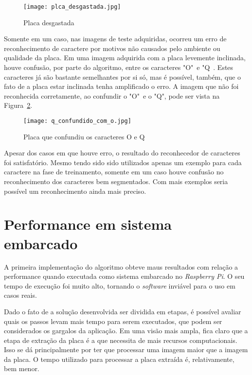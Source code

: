 \begin{figure}[H]
	\centering
	\texttt{[image: plca\_desgastada.jpg]}
	\caption{Placa desgastada}
	\label{fig:placa_desgastada}
\end{figure}

Somente em um caso, nas imagens de teste adquiridas, ocorreu um erro de reconhecimento de caractere por motivos não causados pelo ambiente ou qualidade da placa. Em uma imagem adquirida com a placa levemente inclinada, houve confusão, por parte do algoritmo, entre os caracteres "O"~e "Q~. Estes caracteres já são bastante semelhantes por si só, mas é possível, também, que o fato de a placa estar inclinada tenha amplificado o erro. A imagem que não foi reconhecida corretamente, ao confundir o "O"~e o "Q", pode ser vista na Figura~\ref{fig:q_confundido_com_o}.

\begin{figure}[H]
	\centering
	\texttt{[image: q\_confundido\_com\_o.jpg]}
	\caption{Placa que confundiu os caracteres O e Q}
	\label{fig:q_confundido_com_o}
\end{figure}

Apesar dos casos em que houve erro, o resultado do reconhecedor de caracteres foi satisfatório. Mesmo tendo sido sido utilizados apenas um exemplo para cada caractere na fase de treinamento, somente em um caso houve confusão no reconhecimento dos caracteres bem segmentados. Com mais exemplos seria possível um reconhecimento ainda mais preciso.

\section{Performance em sistema embarcado}
\label{sec:performance_resultados}

A primeira implementação do algoritmo obteve maus resultados com relação a
performance quando executada como sistema embarcado no \emph{Raspberry Pi}. 
O seu tempo de execução foi muito alto, tornando o \emph{software} inviável para 
o uso em casos reais.

Dado o fato de a solução desenvolvida ser dividida em etapas, é possível avaliar
quais os passos levam mais tempo para serem executados, que podem ser
considerados os gargalos da aplicação. Em uma visão mais ampla, fica claro que a
etapa de extração da placa é a que necessita de mais recursos computacionais.
Isso se dá principalmente por ter que processar uma imagem maior que a imagem da
placa. O tempo utilizado para processar a placa extraída é, relativamente, bem
menor.

